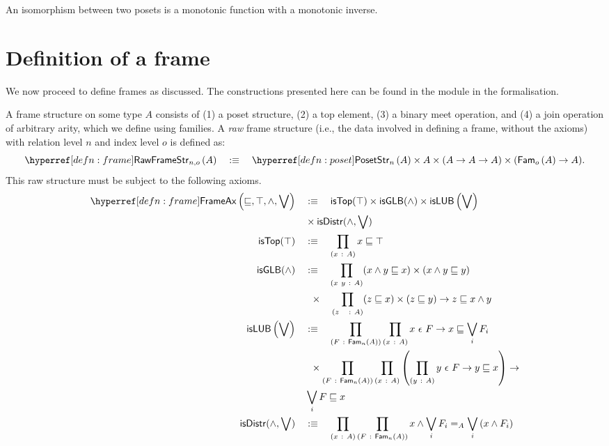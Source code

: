 \begin{defn}
  An isomorphism between two posets is a monotonic function with a monotonic inverse.
\end{defn}

\section{Definition of a frame}\label{sec:frame}

We now proceed to define frames as discussed. The constructions presented here can be
found in the  module in the \veragda{} formalisation.
\begin{defn}[Frame]\label{defn:frame}
  A frame structure on some type $A$ consists of (1) a poset structure, (2) a top element,
  (3) a binary meet operation, and (4) a join operation of arbitrary arity, which we
  define using families. A \emph{raw} frame structure (i.e., the data involved in defining
  a frame, without the axioms) with relation level $n$ and index level $o$ is defined as:
  \begin{equation*}
    \rawframestr{n}{o}{A} \quad\is\quad \posetstr{n}{A} \times A \times (A \rightarrow A \rightarrow A) \times (\sub{o}{A} \rightarrow A).
  \end{equation*}
  This raw structure must be subject to the following axioms.
  \begin{align*}
    \frameax{\sqsubseteq, \top, \wedge, \bigvee} \quad&\is\quad
      \mathsf{isTop}(\top) \times \mathsf{isGLB}(\wedge) \times \mathsf{isLUB}\left( \bigvee \right)\\
      &\times \mathsf{isDistr}(\wedge, \bigvee)\\
    \mathsf{isTop}(\top) \quad&\is\quad \pity{x}{A}{x \sqsubseteq \top}\\
    \mathsf{isGLB}(\wedge) \quad&\is\quad \pity{x~y}{A}{(x \wedge y \sqsubseteq x) \times (x \wedge y \sqsubseteq y)}\\
                       &\hspace{0.55em}\times\quad \pity{z~~}{A}{(z \sqsubseteq x) \times (z \sqsubseteq y) \rightarrow z \sqsubseteq x \wedge y}\\
    \mathsf{isLUB}\left(\bigvee\right) \quad&\is\quad
         \pity{F}{\sub{n}{A}}{\pity{x}{A}{\memfam{x}{F} \rightarrow x \sqsubseteq \bigvee_i F_i}}\\
         &\hspace{0.55em}\times \pity{F}{\sub{n}{A}}{\pity{x}{A}{
               \left( \pity{y}{A}{\memfam{y}{F} \rightarrow y \sqsubseteq x}\right) \rightarrow\\ &\bigvee_i F \sqsubseteq x
             }}\\
    \mathsf{isDistr}(\wedge, \bigvee) \quad&\is\quad
      \pity{x}{A}{\pity{F}{\sub{n}{A}}{
          x \wedge \bigvee_i F_i} =_A \bigvee_i \left( x \wedge F_i \right)
      }
  \end{align*}
\end{defn}


